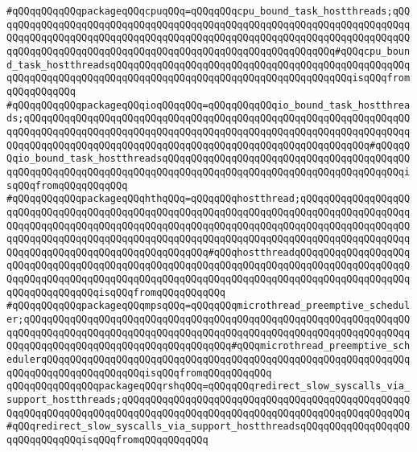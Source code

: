 \verb|#qQQqqQQqqQQqpackageqQQqcpuqQQq=qQQqqQQqcpu_bound_task_hostthreads;qQQqqQQqqQQqqQQqqQQqqQQqqQQqqQQqqQQqqQQqqQQqqQQqqQQqqQQqqQQqqQQqqQQqqQQqqQQqqQQqqQQqqQQqqQQqqQQqqQQqqQQqqQQqqQQqqQQqqQQqqQQqqQQqqQQqqQQqqQQqqQQqqQQqqQQqqQQqqQQqqQQqqQQqqQQqqQQqqQQqqQQqqQQqqQQqqQQqqQQq#qQQqcpu_bound_task_hostthreadsqQQqqQQqqQQqqQQqqQQqqQQqqQQqqQQqqQQqqQQqqQQqqQQqqQQqqQQqqQQqqQQqqQQqqQQqqQQqqQQqqQQqqQQqqQQqqQQqqQQqqQQqqQQqqQQqisqQQqfromqQQqqQQqqQQq|\newline
\verb|#qQQqqQQqqQQqpackageqQQqioqQQqqQQq=qQQqqQQqqQQqio_bound_task_hostthreads;qQQqqQQqqQQqqQQqqQQqqQQqqQQqqQQqqQQqqQQqqQQqqQQqqQQqqQQqqQQqqQQqqQQqqQQqqQQqqQQqqQQqqQQqqQQqqQQqqQQqqQQqqQQqqQQqqQQqqQQqqQQqqQQqqQQqqQQqqQQqqQQqqQQqqQQqqQQqqQQqqQQqqQQqqQQqqQQqqQQqqQQqqQQqqQQqqQQqqQQq#qQQqqQQqio_bound_task_hostthreadsqQQqqQQqqQQqqQQqqQQqqQQqqQQqqQQqqQQqqQQqqQQqqQQqqQQqqQQqqQQqqQQqqQQqqQQqqQQqqQQqqQQqqQQqqQQqqQQqqQQqqQQqqQQqqQQqisqQQqfromqQQqqQQqqQQq|\newline
\verb|#qQQqqQQqqQQqpackageqQQqhthqQQq=qQQqqQQqhostthread;qQQqqQQqqQQqqQQqqQQqqQQqqQQqqQQqqQQqqQQqqQQqqQQqqQQqqQQqqQQqqQQqqQQqqQQqqQQqqQQqqQQqqQQqqQQqqQQqqQQqqQQqqQQqqQQqqQQqqQQqqQQqqQQqqQQqqQQqqQQqqQQqqQQqqQQqqQQqqQQqqQQqqQQqqQQqqQQqqQQqqQQqqQQqqQQqqQQqqQQqqQQqqQQqqQQqqQQqqQQqqQQqqQQqqQQqqQQqqQQqqQQqqQQqqQQqqQQqqQQqqQQq#qQQqhostthreadqQQqqQQqqQQqqQQqqQQqqQQqqQQqqQQqqQQqqQQqqQQqqQQqqQQqqQQqqQQqqQQqqQQqqQQqqQQqqQQqqQQqqQQqqQQqqQQqqQQqqQQqqQQqqQQqqQQqqQQqqQQqqQQqqQQqqQQqqQQqqQQqqQQqqQQqqQQqqQQqqQQqqQQqqQQqqQQqisqQQqfromqQQqqQQqqQQq|\newline
\verb|#qQQqqQQqqQQqpackageqQQqmpsqQQq=qQQqqQQqmicrothread_preemptive_scheduler;qQQqqQQqqQQqqQQqqQQqqQQqqQQqqQQqqQQqqQQqqQQqqQQqqQQqqQQqqQQqqQQqqQQqqQQqqQQqqQQqqQQqqQQqqQQqqQQqqQQqqQQqqQQqqQQqqQQqqQQqqQQqqQQqqQQqqQQqqQQqqQQqqQQqqQQqqQQqqQQqqQQqqQQqqQQqqQQq#qQQqmicrothread_preemptive_schedulerqQQqqQQqqQQqqQQqqQQqqQQqqQQqqQQqqQQqqQQqqQQqqQQqqQQqqQQqqQQqqQQqqQQqqQQqqQQqqQQqqQQqqQQqisqQQqfromqQQqqQQqqQQq|\newline
\verb|qQQqqQQqqQQqqQQqpackageqQQqrshqQQq=qQQqqQQqredirect_slow_syscalls_via_support_hostthreads;qQQqqQQqqQQqqQQqqQQqqQQqqQQqqQQqqQQqqQQqqQQqqQQqqQQqqQQqqQQqqQQqqQQqqQQqqQQqqQQqqQQqqQQqqQQqqQQqqQQqqQQqqQQqqQQqqQQqqQQq#qQQqredirect_slow_syscalls_via_support_hostthreadsqQQqqQQqqQQqqQQqqQQqqQQqqQQqqQQqisqQQqfromqQQqqQQqqQQq|\newline
